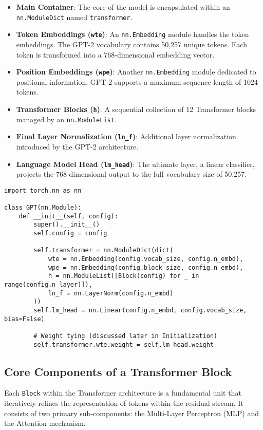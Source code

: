 \begin{itemize}
    \item \textbf{Main Container}: The core of the model is encapsulated within an \texttt{nn.ModuleDict} named \texttt{transformer}.
    \item \textbf{Token Embeddings (\texttt{wte})}: An \texttt{nn.Embedding} module handles the token embeddings. The GPT-2 vocabulary contains 50,257 unique tokens. Each token is transformed into a 768-dimensional embedding vector.
    \item \textbf{Position Embeddings (\texttt{wpe})}: Another \texttt{nn.Embedding} module dedicated to positional information. GPT-2 supports a maximum sequence length of 1024 tokens.
    \item \textbf{Transformer Blocks (\texttt{h})}: A sequential collection of 12 Transformer blocks managed by an \texttt{nn.ModuleList}.
    \item \textbf{Final Layer Normalization (\texttt{ln\_f})}: Additional layer normalization introduced by the GPT-2 architecture.
    \item \textbf{Language Model Head (\texttt{lm\_head})}: The ultimate layer, a linear classifier, projects the 768-dimensional output to the full vocabulary size of 50,257.
\end{itemize}

\begin{lstlisting}[caption={GPT Model Skeleton}]
import torch.nn as nn

class GPT(nn.Module):
    def __init__(self, config):
        super().__init__()
        self.config = config

        self.transformer = nn.ModuleDict(dict(
            wte = nn.Embedding(config.vocab_size, config.n_embd),
            wpe = nn.Embedding(config.block_size, config.n_embd),
            h = nn.ModuleList([Block(config) for _ in range(config.n_layer)]),
            ln_f = nn.LayerNorm(config.n_embd)
        ))
        self.lm_head = nn.Linear(config.n_embd, config.vocab_size, bias=False)

        # Weight tying (discussed later in Initialization)
        self.transformer.wte.weight = self.lm_head.weight
\end{lstlisting}

\subsection{Core Components of a Transformer Block}
Each \texttt{Block} within the Transformer architecture is a fundamental unit that iteratively refines the representation of tokens within the residual stream. It consists of two primary sub-components: the Multi-Layer Perceptron (MLP) and the Attention mechanism.

